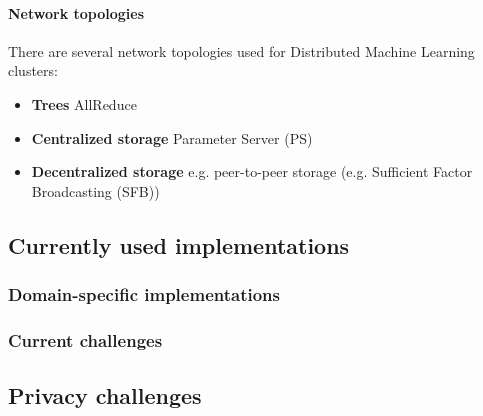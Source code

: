 \paragraph{Network topologies}
There are several network topologies used for Distributed Machine Learning clusters:
\begin{itemize}
	\item \textbf{Trees} AllReduce\cite{Agar14}
	\item \textbf{Centralized storage} Parameter Server (PS)\cite{Agar14}
	\item \textbf{Decentralized storage} e.g. peer-to-peer storage (e.g. Sufficient Factor Broadcasting (SFB)\cite{Li13})
\end{itemize}










\subsection{Currently used implementations}

\subsubsection{Domain-specific implementations}
\subsubsection{Current challenges}










\subsection{Privacy challenges}

